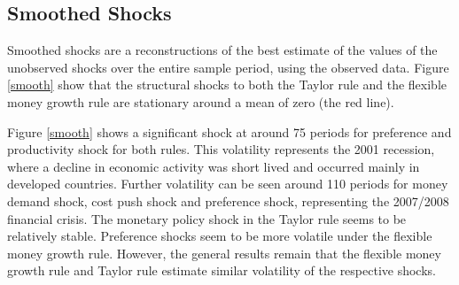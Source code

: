 \documentclass[11pt,preprint, authoryear]{elsarticle}
\numberwithin{equation}{section}
\numberwithin{figure}{section}
\numberwithin{table}{section}
\begin{document}
\hypertarget{smoothed-shocks}{%
\subsection{Smoothed Shocks}\label{smoothed-shocks}}

Smoothed shocks are a reconstructions of the best estimate of the values
of the unobserved shocks over the entire sample period, using the
observed data. Figure \ref{smooth} show that the structural shocks to
both the Taylor rule and the flexible money growth rule are stationary
around a mean of zero (the red line).

Figure \ref{smooth} shows a significant shock at around 75 periods for
preference and productivity shock for both rules. This volatility
represents the 2001 recession, where a decline in economic activity was
short lived and occurred mainly in developed countries. Further
volatility can be seen around 110 periods for money demand shock, cost
push shock and preference shock, representing the 2007/2008 financial
crisis. The monetary policy shock in the Taylor rule seems to be
relatively stable. Preference shocks seem to be more volatile under the
flexible money growth rule. However, the general results remain that the
flexible money growth rule and Taylor rule estimate similar volatility
of the respective shocks.
\end{document}
